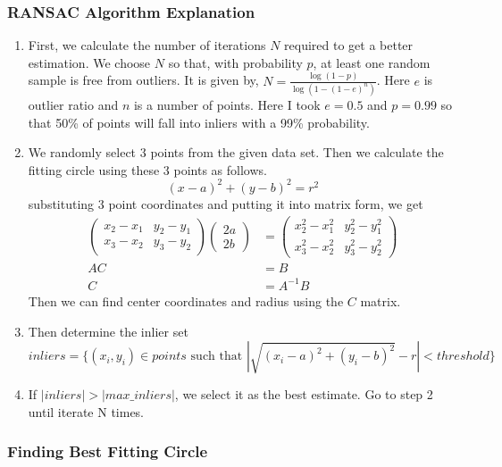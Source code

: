 \documentclass[a4paper]{article}
\begin{document}
\subsubsection*{RANSAC Algorithm Explanation}
\begin{enumerate}
  \item First, we calculate the number of iterations $N$ required to get a better estimation. We choose $N$ 
  so that, with probability $p$, at least one random sample is free from outliers.
  It is given by, $N=\frac{\log{(1-p)}}{\log{(1-(1-e)^n)}}$. Here $e$ is outlier
  ratio and $n$ is a number of points. Here I took $e=0.5$ and $p=0.99$ so 
  that 50\% of points will fall into inliers with a 99\% probability.
  \item We randomly select 3 points from the given data set. Then we calculate the fitting
   circle using these 3 points as follows.
   $$(x-a)^2+(y-b)^2=r^2$$substituting 3 point coordinates and putting it into matrix form, we get
   \begin{align*}
     \begin{pmatrix}
       x_2-x_1 & y_2-y_1\\
       x_3-x_2 & y_3-y_2
     \end{pmatrix}
     \begin{pmatrix}
       2a\\
       2b
     \end{pmatrix}&=
     \begin{pmatrix}
      x_2^2-x_1^2 & y_2^2-y_1^2\\
      x_3^2-x_2^2 & y_3^2-y_2^2
    \end{pmatrix}\\
    AC&=B\\
    C&=A^{-1}B
   \end{align*}
   Then we can find center coordinates and radius using the $C$ matrix.
   \item Then determine the inlier set 
   $$inliers=\{(x_i,y_i)\in points \text{ such that }|\sqrt{(x_i-a)^2+(y_i-b)^2}-r|<threshold\}$$
   \item If $|inliers|>|max\_inliers|$, we select it as the best estimate. Go to step 2
   until iterate N times.
  \end{enumerate}

  \subsubsection*{Finding Best Fitting Circle}
\end{document}
